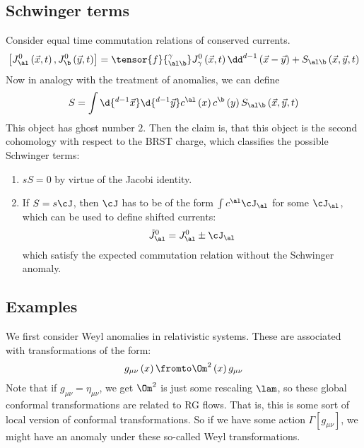 \documentclass{booc}
\begin{document}
\subsection{Schwinger terms}

Consider equal time commutation relations of conserved currents.
\begin{equation}
\left[ J^0_\al\left( \vec{x} , t \right) , J_\b^0\left( \vec{y} , t \right) \right] = 
\tensor{f}{_{\al \b}^\gamma} J^0_\gamma\left( \vec{x} , t \right) \dd^{d-1}\left( \vec{x}- \vec{y} \right)
+ S_{\al \b}\left( \vec{x} , \vec{y} , t \right)
\end{equation}
Now in analogy with the treatment of anomalies, we can define 
\begin{equation}
S = 
\int 
\d{^{d-1}\vec{x}} \d{^{d-1}\vec{y}} 
c^\al \left( x \right)c^\b\left( y \right)S_{\al \b}\left( \vec{x} , \vec{y} , t \right)
\end{equation}
This object has ghost number $2$.
Then the claim is, that this object is the second cohomology with respect to the BRST charge,
which classifies the possible Schwinger terms:
\begin{enumerate}
\item $sS = 0$ by virtue of the Jacobi identity.
\item If $S = s\cJ$, then $\cJ$ has to be of the form $\int c^\al \cJ_\al$ for some $\cJ_\al$, 
which can be used to define shifted currents:
\begin{equation}
\tilde J_\al^0 = J_\al^0 \pm \cJ_\al
\end{equation}
which satisfy the expected commutation relation without the Schwinger anomaly.
\end{enumerate}

\subsection{Examples}

We first consider Weyl anomalies in relativistic systems. 
These are associated with transformations of the form:
\begin{equation}
g_{\mu\nu}\left( x \right) \fromto \Om^2\left( x \right) g_{\mu\nu}
\end{equation}
Note that if $g_{\mu\nu} = \eta_{\mu\nu}$, we get
$\Om^2$ is just some rescaling $\lam$, so these global conformal
transformations are related to RG flows.
That is, this is some sort of local version of conformal transformations.
So if we have some action $\Gamma\left[ g_{\mu\nu} \right]$, we might have an anomaly under these
so-called Weyl transformations. 
\end{document}
